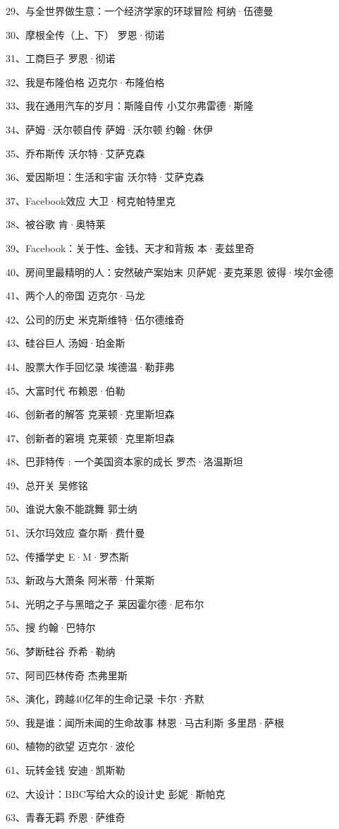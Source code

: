 29、与全世界做生意：一个经济学家的环球冒险 柯纳·伍德曼

30、摩根全传（上、下） 罗恩·彻诺

31、工商巨子 罗恩·彻诺

32、我是布隆伯格 迈克尔·布隆伯格

33、我在通用汽车的岁月：斯隆自传 小艾尔弗雷德·斯隆

34、萨姆·沃尔顿自传 萨姆·沃尔顿 约翰·休伊

35、乔布斯传 沃尔特·艾萨克森

36、爱因斯坦：生活和宇宙 沃尔特·艾萨克森

37、Facebook效应 大卫·柯克帕特里克

38、被谷歌 肯·奥特莱

39、Facebook：关于性、金钱、天才和背叛 本·麦兹里奇

40、房间里最精明的人：安然破产案始末 贝萨妮·麦克莱恩 彼得·埃尔金德

41、两个人的帝国 迈克尔·马龙

42、公司的历史 米克斯维特·伍尔德维奇

43、硅谷巨人 汤姆·珀金斯

44、股票大作手回忆录 埃德温·勒菲弗

45、大富时代 布赖恩·伯勒

46、创新者的解答 克莱顿·克里斯坦森

47、创新者的窘境 克莱顿·克里斯坦森

48、巴菲特传 : 一个美国资本家的成长 罗杰·洛温斯坦

49、总开关 吴修铭

50、谁说大象不能跳舞 郭士纳

51、沃尔玛效应 查尔斯·费什曼

52、传播学史 E·M·罗杰斯

53、新政与大萧条 阿米蒂·什莱斯

54、光明之子与黑暗之子 莱因霍尔德·尼布尔

55、搜 约翰·巴特尔

56、梦断硅谷 乔希·勒纳

57、阿司匹林传奇 杰弗里斯

58、演化，跨越40亿年的生命记录 卡尔·齐默

59、我是谁：闻所未闻的生命故事 林恩·马古利斯 多里昂·萨根

60、植物的欲望 迈克尔·波伦

61、玩转金钱 安迪·凯斯勒

62、大设计：BBC写给大众的设计史 彭妮·斯帕克

63、青春无羁 乔恩·萨维奇


